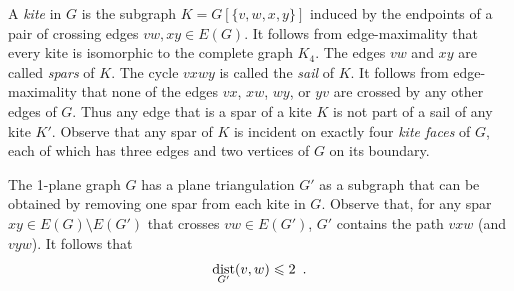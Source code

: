 \documentclass{patmorin}
\DeclareMathOperator{\dist}{dist}
\renewcommand{\le}{\leqslant}
\begin{document}
A \emph{kite} in $G$ is the subgraph $K=G[\{v,w,x,y\}]$ induced by the endpoints of a pair of crossing edges $vw,xy\in E(G)$.  It follows from edge-maximality that every kite is isomorphic to the complete graph $K_4$.
The edges $vw$ and $xy$ are called \emph{spars} of $K$.  The cycle $vxwy$ is called the \emph{sail} of $K$.  It follows from edge-maximality that none of the edges $vx$, $xw$, $wy$, or $yv$ are crossed by any other edges of $G$. Thus any edge that is a spar of a kite $K$ is not part of a sail of any kite $K'$. Observe that any spar of $K$ is incident on exactly four \emph{kite faces} of $G$, each of which has three edges and two vertices of $G$ on its boundary.

The 1-plane graph $G$ has a plane triangulation $G'$ as a subgraph that can be obtained by removing one spar from each kite in $G$.  Observe that, for any spar $xy\in E(G)\setminus E(G')$ that crosses $vw\in E(G')$, $G'$ contains the path $vxw$ (and $vyw$).  It follows that 
\begin{equation}
  \dist_{G'}(v,w)\le 2 \enspace . \eqlabel{spar-distance}
\end{equation}
\end{document}
